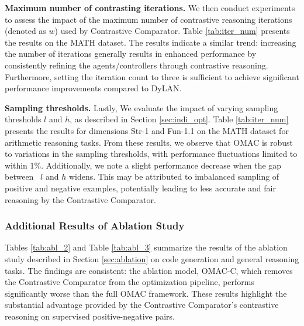 \noindent \textbf{Maximum number of contrasting iterations.} We then conduct experiments to assess the impact of the maximum number of contrastive reasoning iterations (denoted as $w$) used by Contrastive Comparator. Table \ref{tab:iter_num} presents the results on the MATH dataset. The results indicate a similar trend: increasing the number of iterations generally results in enhanced performance by consistently refining the agents/controllers through contrastive reasoning. Furthermore, setting the iteration count to three is sufficient to achieve significant performance improvements compared to DyLAN.





\noindent \textbf{Sampling thresholds.} Lastly, We evaluate the impact of varying sampling thresholds $l$ and $h$, as described in Section \ref{sec:indi_opt}. Table \ref{tab:iter_num} presents the results for dimensions Str-1 and Fun-1.1 on the MATH dataset for arithmetic reasoning tasks. From these results, we observe that OMAC is robust to variations in the sampling thresholds, with performance fluctuations limited to within 1\%. Additionally, we note a slight performance decrease when the gap between \ $l$ and $h$ widens. This may be attributed to imbalanced sampling of positive and negative examples, potentially leading to less accurate and fair reasoning by the Contrastive Comparator.








\subsubsection{Additional Results of Ablation Study}\label{sec:add_abl}


Tables \ref{tab:abl_2} and Table \ref{tab:abl_3} summarize the results of the ablation study described in Section \ref{sec:ablation} on code generation and general reasoning tasks. The findings are consistent: the ablation model, OMAC-C, which removes the Contrastive Comparator from the optimization pipeline, performs significantly worse than the full OMAC framework. These results highlight the substantial advantage provided by the Contrastive Comparator’s contrastive reasoning on supervised positive-negative pairs.









